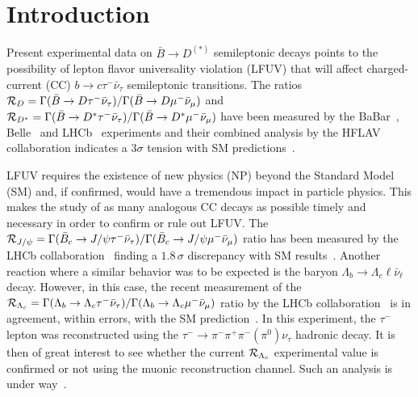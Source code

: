 \documentclass[aps,superscriptaddress,showpacs,nofootinbib,11pt]{revtex4-1}
\begin{document}
%



\maketitle
%

%
\section{Introduction}
%

Present experimental data on $\bar B\to D^{(*)}$ semileptonic decays points to the possibility of lepton flavor universality violation (LFUV) 
 that will affect charged-current (CC) $b\to c\tau^-\bar\nu_\tau$ semileptonic transitions. The ratios ${\cal R}_{D}=\Gamma(\bar B\to D\tau^-\bar\nu_\tau)/\Gamma(\bar B\to D\mu^-\bar\nu_\mu)$ and  ${\cal R}_{D^*}=\Gamma(\bar B\to D^*\tau^-\bar\nu_\tau)/\Gamma(\bar B\to D^*\mu^-\bar\nu_\mu)$ have been measured by the 
BaBar~\cite{BaBar:2012obs, BaBar:2013mob}, Belle~\cite{Belle:2015qfa, 
Belle:2016ure,Belle:2016dyj,Belle:2019rba} and LHCb~\cite{LHCb:2015gmp, 
LHCb:2017smo,LHCb:2017rln,LHCb:2023zxo} experiments and their combined analysis by the HFLAV
collaboration indicates a $3\sigma$ tension with SM 
predictions~\cite{HFLAV:2019otj,LHCbseminar}. 

 LFUV requires the existence of new physics (NP) beyond the Standard Model (SM) and, if confirmed, would have a tremendous impact in particle physics. This  makes the study of as many analogous CC decays as possible timely and necessary in order to confirm or rule out LFUV. 
 The 
${\cal R}_{J/\psi}=
  \Gamma(\bar B_c\to J/\psi\tau^-\bar\nu_\tau)/\Gamma(\bar B_c\to
   J/\psi\mu^-\bar\nu_\mu)$ ratio has  been measured by the LHCb 
   collaboration~\cite{LHCb:2017vlu} finding a $1.8\,\sigma$  discrepancy with SM 
   results~\cite{Anisimov:1998uk,Ivanov:2006ni,
Hernandez:2006gt,Huang:2007kb,Wang:2008xt,Wen-Fei:2013uea, Watanabe:2017mip, Issadykov:2018myx,Tran:2018kuv,
Hu:2019qcn,Leljak:2019eyw,Azizi:2019aaf,Wang:2018duy}. 
 Another reaction where a similar behavior was to be expected is
 the baryon $\Lambda_b \to \Lambda_c\ell\bar\nu_\ell$ decay. However, in this case, the recent measurement of the 
${\cal
R}_{\Lambda_c}=\Gamma(\Lambda_b\to\Lambda_c\tau^-\bar\nu_\tau)/
\Gamma(\Lambda_b\to\Lambda_c\mu^-\bar\nu_\mu)$ ratio by the LHCb 
collaboration~\cite{LHCb:2022piu} is
in agreement,  within errors,
with the SM prediction~\cite{Detmold:2015aaa}. In this experiment, the $\tau^-$
lepton was reconstructed using  the  $\tau^-\to\pi^-\pi^+\pi^-(\pi^0)\nu_\tau$ hadronic decay. It is then of great interest to see whether the current ${\cal R}_{\Lambda_c}$ experimental value is confirmed or not using the muonic reconstruction channel. Such an analysis is under way~\cite{Marco}.
\end{document}
